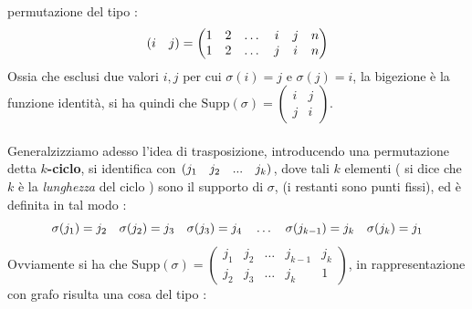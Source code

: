\documentclass[12pt, letterpaper]{article}
\newcommand{\spaz}{{\text{\hphantom{aa}}}}
\newcommand{\supp}{{\text{Supp}}}
\newcommand{\acc}{\\\hphantom{}\\}
\begin{document}
permutazione del tipo :\begin{equation}
    (i\spaz{ }j)=\begin{pmatrix}
        1 & 2 & \dots&i&j&n\\
        1 & 2 & \dots&j&i&n
        \end{pmatrix}
\end{equation}
Ossia che esclusi due valori \(i,j\) per cui \(\sigma(i)=j\) e \(\sigma(j)=i\), la bigezione è la funzione identità, 
si ha quindi che \(\supp(\sigma)=\begin{pmatrix}i&j\\j&i\end{pmatrix}\).\acc 
Generalzizziamo adesso l'idea di trasposizione, introducendo una permutazione detta \(k\)\textbf{-ciclo}, 
si identifica con \((j_1\spaz j_2\spaz...\spaz j_k)\), dove tali \(k\) elementi ( si dice che \(k\) è la \textit{lunghezza} del ciclo ) sono il supporto di \(\sigma\),
(i restanti sono punti fissi), ed è definita in tal modo :\begin{equation}
    \sigma(j_1)=j_2\spaz\sigma(j_2)=j_3\spaz\sigma(j_3)=j_4\spaz\dots\spaz\sigma(j_{k-1})=j_k\spaz \sigma(j_k)=j_1
\end{equation}
Ovviamente si ha che \(\supp(\sigma)=\begin{pmatrix}j_1&j_2&\dots&j_{k-1}&j_k\\j_2&j_3&\dots&j_k&1\end{pmatrix}\), in rappresentazione 
con grafo risulta una cosa del tipo :
\begin{figure}[h]
\end{figure}\\
\end{document}
